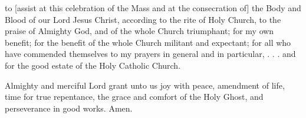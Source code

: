  to [assist at this celebration of the Mass and at the consecration of] the Body and Blood of our Lord Jesus Christ, according to the rite of Holy Church, to the praise of Almighty God, and of the whole Church triumphant; for my own benefit; for the benefit of the whole Church militant and expectant; for all who have commended themselves to my prayers in general and in particular,  . . . and for the good estate of the Holy Catholic Church.
\par
{}
 Almighty and merciful Lord grant unto us joy with peace, amendment of life, time for true repentance, the grace and comfort of the Holy Ghost, and perseverance in good works. Amen.